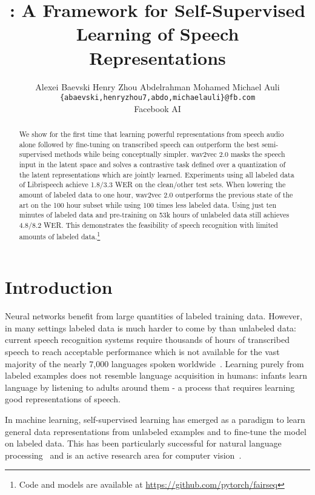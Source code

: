 \documentclass{article}
\title{\LARGE \wvpp{}: A Framework for Self-Supervised Learning of Speech Representations}
\author{Alexei Baevski \And Henry Zhou \And Abdelrahman Mohamed \And Michael Auli \AND 
  {\tt \{abaevski,henryzhou7,abdo,michaelauli\}@fb.com} \\\AND
  Facebook AI
}
\begin{document}
\maketitle

\begin{abstract}
  We show for the first time that learning powerful representations from speech audio alone followed by fine-tuning on transcribed speech can outperform the best semi-supervised methods while being conceptually simpler.
  wav2vec 2.0 masks the speech input in the latent space and solves a contrastive task defined over a quantization of the latent representations which are jointly learned.
  Experiments using all labeled data of Librispeech achieve 1.8/3.3 WER on the clean/other test sets.
  When lowering the amount of labeled data to one hour, wav2vec 2.0 outperforms the previous state of the art on the 100 hour subset while using 100 times less labeled data.
  Using just ten minutes of labeled data and pre-training on 53k hours of unlabeled data still achieves 4.8/8.2 WER.
  This demonstrates the feasibility of speech recognition with limited amounts of labeled data.\footnote{Code and models are available at \url{https://github.com/pytorch/fairseq}}
\end{abstract}

\section{Introduction}

Neural networks benefit from large quantities of labeled training data. 
However, in many settings labeled data is much harder to come by than unlabeled data: 
current speech recognition systems require thousands of hours of transcribed speech to reach acceptable performance which is not available for the vast majority of the nearly 7,000 languages spoken worldwide~\citep{lewis2016ethnologue}. 
Learning purely from labeled examples does not resemble language acquisition in humans: infants learn language by listening to adults around them - a process that requires learning good representations of speech.

In machine learning, self-supervised learning has emerged as a paradigm to learn general data representations from unlabeled examples and to fine-tune the model on labeled data. 
This has been particularly successful for natural language processing~\citep{peters2018acl,radford2018unsup,devlin2018bert} and is an active research area for computer vision~\citep{henaff2019cpc,bachman2019learning,misra2019selfsupervised,he2019momentum,chen2020simple}.
\end{document}
